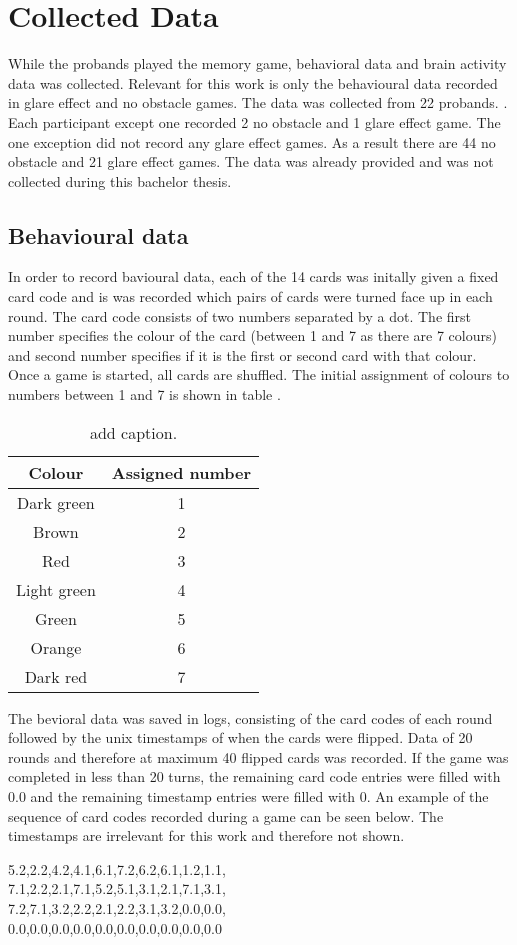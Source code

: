 \chapter{Collected Data}
\label{collected_data}
While the probands played the memory game, behavioral data and brain activity data was collected. Relevant for this work is only the behavioural data recorded in glare effect and no obstacle games. The data was collected from 22 probands. . Each participant except one recorded 2 no obstacle and 1 glare effect game. The one exception did not record any glare effect games. As a result there are 44 no obstacle and 21 glare effect games. The data was already provided and was not collected during this bachelor thesis.

\section{Behavioural data}
\label{behavioural_data}
In order to record bavioural data, each of the 14 cards was initally given a fixed card code and is was recorded which pairs of cards were turned face up in each round. The card code consists of two numbers separated by a dot. The first number specifies the colour of the card (between 1 and 7 as there are 7 colours) and second number specifies if it is the first or second card with that colour. Once a game is started, all cards are shuffled. The initial assignment of colours to numbers between 1 and 7 is shown in table .

\begin{table}[H]
	\centering
	\caption{add caption.}%
	\begin{tabular}{|c|c|}
		\hline
		Colour & Assigned number  \\
		\hline
		Dark green & 1 \\
		Brown & 2 \\
		Red & 3 \\
		Light green & 4 \\
		Green & 5 \\
		Orange & 6 \\
		Dark red & 7 \\
		\hline
	\end{tabular}
\end{table}

The bevioral data was saved in logs, consisting of the card codes of each round followed by the unix timestamps of when the cards were flipped. Data of 20 rounds and therefore at maximum 40 flipped cards was recorded. If the game was completed in less than 20 turns, the remaining card code entries were filled with 0.0 and the remaining timestamp entries were filled with 0. An example of the sequence of card codes recorded during a game can be seen below. The timestamps are irrelevant for this work and therefore not shown. 
\begin{center}
	5.2,2.2,4.2,4.1,6.1,7.2,6.2,6.1,1.2,1.1,\\
	7.1,2.2,2.1,7.1,5.2,5.1,3.1,2.1,7.1,3.1,\\
	7.2,7.1,3.2,2.2,2.1,2.2,3.1,3.2,0.0,0.0,\\
	0.0,0.0,0.0,0.0,0.0,0.0,0.0,0.0,0.0,0.0
\end{center}

